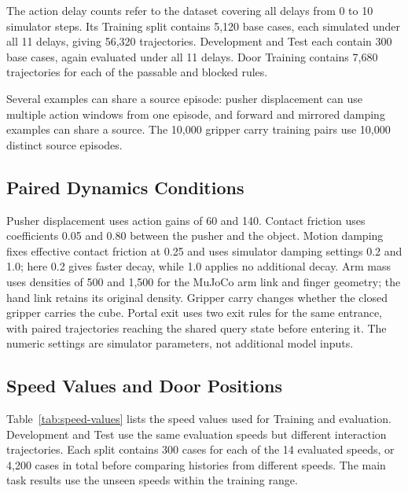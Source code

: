 The action delay counts refer to the dataset covering all delays from 0 to 10 simulator steps.
Its Training split contains 5,120 base cases, each simulated under all 11 delays, giving 56,320 trajectories.
Development and Test each contain 300 base cases, again evaluated under all 11 delays.
Door Training contains 7,680 trajectories for each of the passable and blocked rules.

Several examples can share a source episode: pusher displacement can use multiple action windows from one episode, and forward and mirrored damping examples can share a source.
The 10,000 gripper carry training pairs use 10,000 distinct source episodes.

\subsection{Paired Dynamics Conditions}

Pusher displacement uses action gains of 60 and 140.
Contact friction uses coefficients 0.05 and 0.80 between the pusher and the object.
Motion damping fixes effective contact friction at 0.25 and uses simulator damping settings 0.2 and 1.0; here 0.2 gives faster decay, while 1.0 applies no additional decay.
Arm mass uses densities of 500 and 1,500 for the MuJoCo arm link and finger geometry; the hand link retains its original density.
Gripper carry changes whether the closed gripper carries the cube.
Portal exit uses two exit rules for the same entrance, with paired trajectories reaching the shared query state before entering it.
The numeric settings are simulator parameters, not additional model inputs.

\subsection{Speed Values and Door Positions}

Table~\ref{tab:speed-values} lists the speed values used for Training and evaluation.
Development and Test use the same evaluation speeds but different interaction trajectories.
Each split contains 300 cases for each of the 14 evaluated speeds, or 4,200 cases in total before comparing histories from different speeds.
The main task results use the unseen speeds within the training range.

